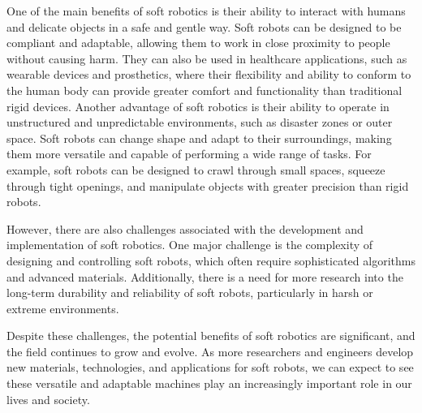 One of the main benefits of soft robotics is their ability to interact with humans and delicate objects in a safe and gentle way. Soft robots can be designed to be compliant and adaptable, allowing them to work in close proximity to people without causing harm. They can also be used in healthcare applications, such as wearable devices and prosthetics, where their flexibility and ability to conform to the human body can provide greater comfort and functionality than traditional rigid devices. Another advantage of soft robotics is their ability to operate in unstructured and unpredictable environments, such as disaster zones or outer space. Soft robots can change shape and adapt to their surroundings, making them more versatile and capable of performing a wide range of tasks. For example, soft robots can be designed to crawl through small spaces, squeeze through tight openings, and manipulate objects with greater precision than rigid robots.

However, there are also challenges associated with the development and implementation of soft robotics. One major challenge is the complexity of designing and controlling soft robots, which often require sophisticated algorithms and advanced materials. Additionally, there is a need for more research into the long-term durability and reliability of soft robots, particularly in harsh or extreme environments.

Despite these challenges, the potential benefits of soft robotics are significant, and the field continues to grow and evolve. As more researchers and engineers develop new materials, technologies, and applications for soft robots, we can expect to see these versatile and adaptable machines play an increasingly important role in our lives and society.
